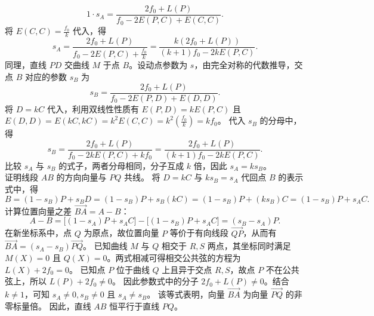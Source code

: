 \begin{solution}
\[ 1 \cdot s_A = \frac{2f_0 + L(P)}{f_0 - 2E(P,C) + E(C,C)}. \]
将 $E(C,C) = \frac{f_0}{k}$ 代入，得
\[ s_A = \frac{2f_0 + L(P)}{f_0 - 2E(P,C) + \frac{f_0}{k}} = \frac{k(2f_0 + L(P))}{(k+1)f_0 - 2k E(P,C)}. \]
同理，直线 $PD$ 交曲线 $M$ 于点 $B$。设动点参数为 $s$，由完全对称的代数推导，交点 $B$ 对应的参数 $s_B$ 为
\[ s_B = \frac{2f_0 + L(P)}{f_0 - 2E(P,D) + E(D,D)}. \]
将 $D = kC$ 代入，利用双线性性质有 $E(P,D) = k E(P,C)$ 且 $E(D,D) = E(kC, kC) = k^2 E(C,C) = k^2 \left(\frac{f_0}{k}\right) = k f_0$。
代入 $s_B$ 的分母中，得
\[ s_B = \frac{2f_0 + L(P)}{f_0 - 2k E(P,C) + k f_0} = \frac{2f_0 + L(P)}{(k+1)f_0 - 2k E(P,C)}. \]
比较 $s_A$ 与 $s_B$ 的式子，两者分母相同，分子互成 $k$ 倍，因此 $s_A = k s_B$。\\
证明线段 $AB$ 的方向向量与 $PQ$ 共线。
将 $D = kC$ 与 $k s_B = s_A$ 代回点 $B$ 的表示式中，得
\[ B = (1-s_B)P + s_B D = (1-s_B)P + s_B(k C) = (1-s_B)P + (k s_B)C = (1-s_B)P + s_A C. \]
计算位置向量之差 $\overrightarrow{BA} = A - B$：
\[ A - B = \big[ (1-s_A)P + s_A C \big] - \big[ (1-s_B)P + s_A C \big] = (s_B - s_A)P. \]
在新坐标系中，点 $Q$ 为原点，故位置向量 $P$ 等价于有向线段 $\overrightarrow{QP}$，从而有 $\overrightarrow{BA} = (s_A - s_B) \overrightarrow{PQ}$。
已知曲线 $M$ 与 $Q$ 相交于 $R,S$ 两点，其坐标同时满足 $M(X) = 0$ 且 $Q(X) = 0$。两式相减可得相交公共弦的方程为 $L(X) + 2f_0 = 0$。
已知点 $P$ 位于曲线 $Q$ 上且异于交点 $R,S$，故点 $P$ 不在公共弦上，所以 $L(P) + 2f_0 \neq 0$。
因此参数式中的分子 $2f_0 + L(P) \neq 0$。结合 $k \neq 1$，可知 $s_A \neq 0, s_B \neq 0$ 且 $s_A \neq s_B$。
该等式表明，向量 $\overrightarrow{BA}$ 为向量 $\overrightarrow{PQ}$ 的非零标量倍。
因此，直线 $AB$ 恒平行于直线 $PQ$。
\end{solution}

